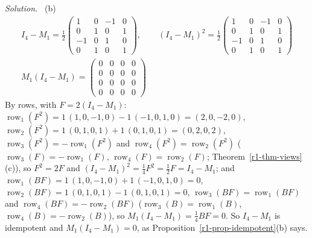 \documentclass[12pt]{article}
\DeclareMathOperator{\row}{row}
\theoremstyle{definition}
\newenvironment{solution}{\par\noindent\textit{Solution.}\ }{\par\smallskip}
\begin{document}
\begin{solution}
(b)
\[
\begin{gathered}
I_4-M_1=\frac12\begin{pmatrix}1&0&-1&0\\0&1&0&1\\-1&0&1&0\\0&1&0&1\end{pmatrix},\qquad
(I_4-M_1)^2=\frac12\begin{pmatrix}1&0&-1&0\\0&1&0&1\\-1&0&1&0\\0&1&0&1\end{pmatrix}\\
M_1(I_4-M_1)=\begin{pmatrix}0&0&0&0\\0&0&0&0\\0&0&0&0\\0&0&0&0\end{pmatrix}
\end{gathered}
\]
By rows, with \(F=2(I_4-M_1)\): \(\row_1(F^2)=1\,(1,0,-1,0)-1\,(-1,0,1,0)=(2,0,-2,0)\),
\(\row_2(F^2)=1\,(0,1,0,1)+1\,(0,1,0,1)=(0,2,0,2)\), \(\row_3(F^2)=-\row_1(F^2)\) and \(\row_4(F^2)=\row_2(F^2)\)
(\(\row_3(F)=-\row_1(F)\), \(\row_4(F)=\row_2(F)\); Theorem~\ref{r1-thm-views}(c)), so \(F^2=2F\) and
\((I_4-M_1)^2=\frac14F^2=\frac12F=I_4-M_1\); and \(\row_1(BF)=1\,(1,0,-1,0)+1\,(-1,0,1,0)=0\),
\(\row_2(BF)=1\,(0,1,0,1)-1\,(0,1,0,1)=0\), \(\row_3(BF)=\row_1(BF)\) and \(\row_4(BF)=-\row_2(BF)\)
(\(\row_3(B)=\row_1(B)\), \(\row_4(B)=-\row_2(B)\)), so \(M_1(I_4-M_1)=\frac14BF=0\). So \(I_4-M_1\) is idempotent and
\(M_1(I_4-M_1)=0\), as Proposition~\ref{r1-prop-idempotent}(b) says.
\end{solution}
\end{document}

